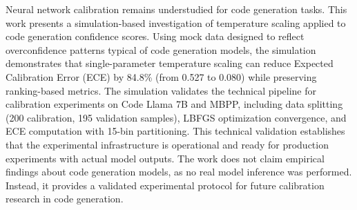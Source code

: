 
Neural network calibration remains understudied for code generation tasks. This work presents a simulation-based investigation of temperature scaling applied to code generation confidence scores. Using mock data designed to reflect overconfidence patterns typical of code generation models, the simulation demonstrates that single-parameter temperature scaling can reduce Expected Calibration Error (ECE) by 84.8\% (from 0.527 to 0.080) while preserving ranking-based metrics. The simulation validates the technical pipeline for calibration experiments on Code Llama 7B and MBPP, including data splitting (200 calibration, 195 validation samples), LBFGS optimization convergence, and ECE computation with 15-bin partitioning. This technical validation establishes that the experimental infrastructure is operational and ready for production experiments with actual model outputs. The work does not claim empirical findings about code generation models, as no real model inference was performed. Instead, it provides a validated experimental protocol for future calibration research in code generation.
